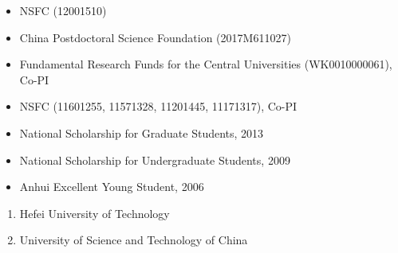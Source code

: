\documentclass[11pt,a4paper]{article}
\begin{document}
\begin{itemize}
\item NSFC (12001510)
\item China Postdoctoral Science Foundation (2017M611027)
\item Fundamental Research Funds for the Central Universities (WK0010000061), Co-PI
\item NSFC (11601255, 11571328, 11201445, 11171317), Co-PI
\end{itemize}


\begin{itemize}
\item National Scholarship for Graduate Students, 2013
\item National Scholarship for Undergraduate Students, 2009
\item Anhui Excellent Young Student, 2006
\end{itemize}


\begin{enumerate}
\item Hefei University of Technology
  \begin{enumerate}
  \end{enumerate}
\item University of Science and Technology of China
  \begin{enumerate}
  \end{enumerate}
\end{enumerate}
\end{document}
